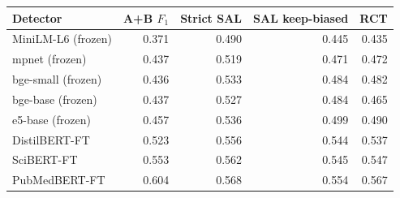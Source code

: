 \begin{tabular}{@{}lrrrr@{}}
\toprule
Detector & A+B $F_1$ & Strict SAL & SAL keep-biased & RCT \\
\midrule
MiniLM-L6 (frozen) & 0.371 & 0.490 & 0.445 & 0.435 \\
mpnet (frozen) & 0.437 & 0.519 & 0.471 & 0.472 \\
bge-small (frozen) & 0.436 & 0.533 & 0.484 & 0.482 \\
bge-base (frozen) & 0.437 & 0.527 & 0.484 & 0.465 \\
e5-base (frozen) & 0.457 & 0.536 & 0.499 & 0.490 \\
DistilBERT-FT & 0.523 & 0.556 & 0.544 & 0.537 \\
SciBERT-FT & 0.553 & 0.562 & 0.545 & 0.547 \\
PubMedBERT-FT & 0.604 & 0.568 & 0.554 & 0.567 \\
\bottomrule
\end{tabular}

